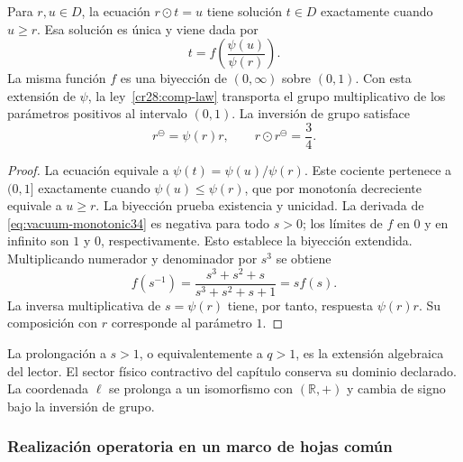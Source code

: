 \begin{proposition}
\label{cr28:comp-inverse}
Para $r,u\in D$, la ecuación $r\odot t=u$ tiene solución $t\in D$
exactamente cuando $u\geq r$. Esa solución es única y viene dada por
\begin{equation}
 t=f\!\left(\frac{\psi(u)}{\psi(r)}\right).
 \label{cr28:comp-cancellation}
\end{equation}
La misma función $f$ es una biyección de $(0,\infty)$ sobre $(0,1)$.
Con esta extensión de $\psi$, la ley~\eqref{cr28:comp-law} transporta el
grupo multiplicativo de los parámetros positivos al intervalo $(0,1)$.
La inversión de grupo satisface
\begin{equation}
 r^{\ominus}=\psi(r)r,\qquad
 r\odot r^{\ominus}=\frac34.
 \label{cr28:comp-group-inverse}
\end{equation}
\end{proposition}
\begin{proof}
La ecuación equivale a
$\psi(t)=\psi(u)/\psi(r)$. Este cociente pertenece a $(0,1]$
exactamente cuando $\psi(u)\leq\psi(r)$, que por monotonía decreciente
equivale a $u\geq r$. La biyección prueba existencia y unicidad.
La derivada de \eqref{eq:vacuum-monotonic34} es negativa para todo $s>0$;
los límites de $f$ en $0$ y en infinito son $1$ y $0$, respectivamente.
Esto establece la biyección extendida. Multiplicando numerador y
denominador por $s^3$ se obtiene
\[
 f(s^{-1})=\frac{s^3+s^2+s}{s^3+s^2+s+1}=s f(s).
\]
La inversa multiplicativa de $s=\psi(r)$ tiene, por tanto, respuesta
$\psi(r)r$. Su composición con $r$ corresponde al parámetro $1$.
\end{proof}

La prolongación a $s>1$, o equivalentemente a $q>1$, es la extensión
algebraica del lector. El sector físico contractivo del capítulo conserva
su dominio declarado. La coordenada $\ell$ se prolonga a un isomorfismo
con $(\mathbb R,+)$ y cambia de signo bajo la inversión de grupo.

\subsubsection{Realización operatoria en un marco de hojas común}

